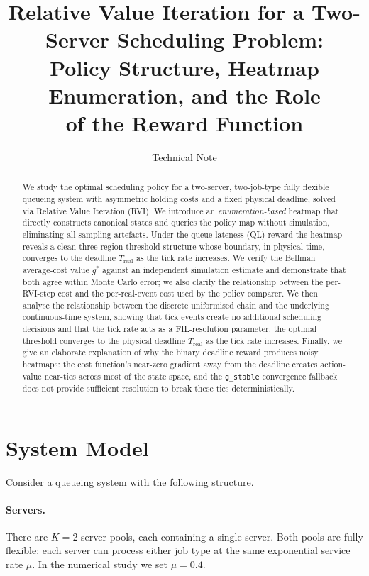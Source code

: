 \documentclass[11pt,a4paper]{article}
\title{Relative Value Iteration for a Two-Server Scheduling Problem:\\
       Policy Structure, Heatmap Enumeration, and the Role\\
       of the Reward Function}
\author{Technical Note}
\date{}
\begin{document}
\maketitle

\begin{abstract}
We study the optimal scheduling policy for a two-server, two-job-type fully
flexible queueing system with asymmetric holding costs and a fixed physical
deadline, solved via Relative Value Iteration (RVI).
We introduce an \emph{enumeration-based} heatmap that directly constructs
canonical states and queries the policy map without simulation, eliminating
all sampling artefacts.
Under the queue-lateness (QL) reward the heatmap reveals a clean three-region
threshold structure whose boundary, in physical time, converges to the deadline
$T_\text{real}$ as the tick rate increases.
We verify the Bellman average-cost value $g^*$ against an independent simulation
estimate and demonstrate that both agree within Monte Carlo error; we also clarify
the relationship between the per-RVI-step cost and the per-real-event cost used
by the policy comparer.
We then analyse the relationship between the discrete uniformised chain and the
underlying continuous-time system, showing that tick events create no additional
scheduling decisions and that the tick rate acts as a FIL-resolution parameter:
the optimal threshold converges to the physical deadline $T_\text{real}$ as the
tick rate increases.
Finally, we give an elaborate explanation of why the binary deadline reward
produces noisy heatmaps: the cost function's near-zero gradient away from the
deadline creates action-value near-ties across most of the state space, and the
\texttt{g\_stable} convergence fallback does not provide sufficient resolution
to break these ties deterministically.
\end{abstract}

\tableofcontents
\newpage

\section{System Model}

Consider a queueing system with the following structure.

\paragraph{Servers.}
There are $K = 2$ server pools, each containing a single server.  Both
pools are fully flexible: each server can process either job type at the same
exponential service rate $\mu$.  In the numerical study we set $\mu = 0.4$.
\end{document}
